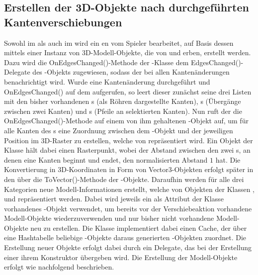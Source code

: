 \subsection{Erstellen der 3D-Objekte nach durchgeführten Kantenverschiebungen}

Sowohl im  als auch im  wird ein en vom Spieler bearbeitet, auf Basis dessen mittels einer Instanz von  3D-Modell-Objekte, die von  und  erben, erstellt werden. Dazu wird die OnEdgesChanged()-Methode der -Klasse dem EdgesChanged()-Delegate des -Objekts zugewiesen, sodass der  bei allen Kantenänderungen benachrichtigt wird.
\newline
\newline
Wurde eine Kantenänderung durchgeführt und OnEdgesChanged() auf dem  aufgerufen, so leert dieser zunächst seine drei Listen mit den bisher vorhandenen s (als Röhren dargestellte Kanten), s (Übergänge zwischen zwei Kanten) und s (Pfeile an selektierten Kanten).
\newline
\newline
Nun ruft der  die OnEdgesChanged()-Methode auf einem von ihm gehaltenen -Objekt auf, um für alle Kanten des s eine Zuordnung zwischen dem -Objekt und der jeweiligen Position im 3D-Raster zu erstellen, welche von  repräsentiert wird. Ein Objekt der Klasse  hält dabei einen Rasterpunkt, wobei der Abstand zwischen den zwei s, an denen eine Kanten beginnt und endet, den normalisierten Abstand $1$ hat. Die Konvertierung in 3D-Koordinaten in Form von Vector3-Objekten erfolgt später in den über die ToVector()-Methode der -Objekte.
\newline
\newline
Daraufhin werden für alle drei Kategorien neue Modell-Informationen erstellt, welche von Objekten der Klassen ,  und  repräsentiert werden. Dabei wird jeweils ein als Attribut der Klasse  vorhandenes -Objekt verwendet, um bereits vor der Verschiebeaktion vorhandene Modell-Objekte wiederzuverwenden und nur bisher nicht vorhandene Modell-Objekte neu zu erstellen. Die Klasse  implementiert dabei einen Cache, der über eine Hashtabelle beliebige -Objekte daraus generierten -Objekten zuordnet. Die Erstellung neuer Objekte erfolgt dabei durch ein Delegate, das bei der Erstellung einer  ihrem Konstruktor übergeben wird.
\newline
\newline
Die Erstellung der Modell-Objekte erfolgt wie nachfolgend beschrieben.

